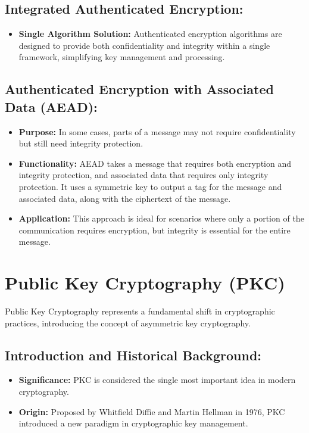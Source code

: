 \documentclass[12pt]{article}
\begin{document}
\subsection*{Integrated Authenticated Encryption:}
\begin{itemize}
    \item \textbf{Single Algorithm Solution:} Authenticated encryption algorithms are designed to provide both confidentiality and integrity within a single framework, simplifying key management and processing.
\end{itemize}

\subsection*{Authenticated Encryption with Associated Data (AEAD):}
\begin{itemize}
    \item \textbf{Purpose:} In some cases, parts of a message may not require confidentiality but still need integrity protection.
    \item \textbf{Functionality:} AEAD takes a message that requires both encryption and integrity protection, and associated data that requires only integrity protection. It uses a symmetric key to output a tag for the message and associated data, along with the ciphertext of the message.
    \item \textbf{Application:} This approach is ideal for scenarios where only a portion of the communication requires encryption, but integrity is essential for the entire message.
\end{itemize}


\section*{Public Key Cryptography (PKC)}

Public Key Cryptography represents a fundamental shift in cryptographic practices, introducing the concept of asymmetric key cryptography.

\subsection*{Introduction and Historical Background:}
\begin{itemize}
    \item \textbf{Significance:} PKC is considered the single most important idea in modern cryptography.
    \item \textbf{Origin:} Proposed by Whitfield Diffie and Martin Hellman in 1976, PKC introduced a new paradigm in cryptographic key management.
\end{itemize}
\end{document}
